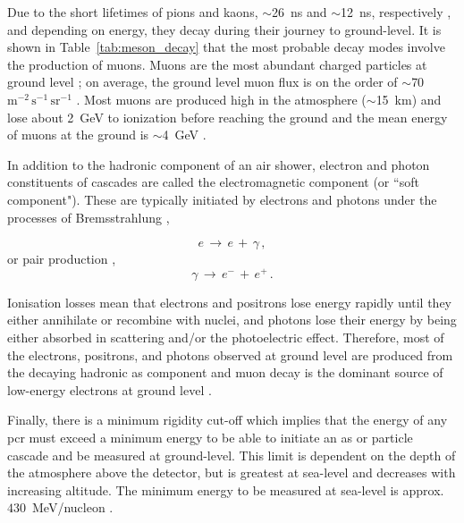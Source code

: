 Due to the short lifetimes of pions and kaons, $\sim$26~ns and $\sim$12~ns, respectively \citep{particle_data_group_review_2020}, and depending on energy, they decay during their journey to ground-level. It is shown in Table~\ref{tab:meson_decay} that the most probable decay modes involve the production of muons. Muons are the most abundant charged particles at ground level \citep{particle_data_group_review_2020}; on average, the ground level muon flux is on the order of $\sim$70~$ \mathrm{m}^{-2}\,\mathrm{s}^{-1}\,\mathrm{sr}^{-1}$ \citep{cecchini_cosmic_2000, blackmore_terrestrial_2015, pereira_ground-level_2021, particle_data_group_review_2020}. Most muons are produced high in the atmosphere ($\sim$15~km) and lose about 2~GeV to ionization before reaching the ground and the mean energy of muons at the ground is $\sim$4~GeV \citep{particle_data_group_review_2020}.


In addition to the hadronic component of an air shower, electron and photon constituents of cascades are called the electromagnetic component (or ``soft component"). These are typically initiated by electrons and photons under the processes of Bremsstrahlung \citep{grupen_astroparticle_2005},

\begin{equation}
\label{eq:bremss}
e \, \rightarrow \, e \, + \, \gamma \, ,
\end{equation}
%
or pair production \citep{grupen_astroparticle_2005},
%
\begin{equation}
\label{eq:pair_prod}
\gamma \, \rightarrow \, e^- \, + \, e^+ \, .
\end{equation}

Ionisation losses mean that electrons and positrons lose energy rapidly until they either annihilate or recombine with nuclei, and photons lose their energy by being either absorbed in scattering and/or the photoelectric effect. Therefore, most of the electrons, positrons,
and photons observed at ground level are produced from the decaying hadronic \gls{as} component and muon decay is the dominant source of low-energy electrons at ground level \citep{particle_data_group_review_2020}.

Finally, there is a minimum rigidity cut-off which implies that the energy of any \gls{pcr} must exceed a minimum energy to be able to initiate an \gls{as} or particle cascade and be measured at ground-level. This limit is dependent on the depth of the atmosphere above the detector, but is greatest at sea-level and decreases with increasing altitude. The minimum energy to be measured at sea-level is approx. $430$~MeV/nucleon \citep{dorman_theory_2004, dorman_experimental_2004, poluianov_gle_2017}.



